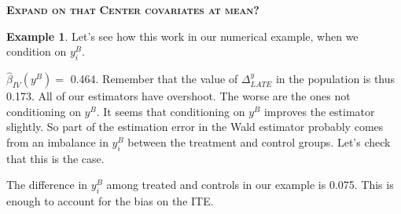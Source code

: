 \documentclass[
]{book}
\newenvironment{Shaded}{\begin{snugshade}}{\end{snugshade}}
\newcommand{\DecValTok}[1]{\textcolor[rgb]{0.00,0.00,0.81}{#1}}
\newcommand{\FloatTok}[1]{\textcolor[rgb]{0.00,0.00,0.81}{#1}}
\newcommand{\FunctionTok}[1]{\textcolor[rgb]{0.00,0.00,0.00}{#1}}
\newcommand{\NormalTok}[1]{#1}
\newcommand{\OtherTok}[1]{\textcolor[rgb]{0.56,0.35,0.01}{#1}}
\newcommand{\SpecialCharTok}[1]{\textcolor[rgb]{0.00,0.00,0.00}{#1}}
\theoremstyle{definition}
\theoremstyle{definition}
\newtheorem{example}{Example}[chapter]
\theoremstyle{definition}
\theoremstyle{definition}
\theoremstyle{remark}
\begin{document}
\textbf{\textsc{Expand on that}}
\textbf{\textsc{Center covariates at mean?}}

\begin{example}
\protect\hypertarget{exm:unnamed-chunk-125}{}{\label{exm:unnamed-chunk-125} }Let's see how this work in our numerical example, when we condition on \(y^B_i\).
\end{example}

\begin{Shaded}
\end{Shaded}

\(\hat{\beta}_{IV}(y^B)=\) 0.464.
Remember that the value of \(\Delta^y_{LATE}\) in the population is thus 0.173.
All of our estimators have overshoot.
The worse are the ones not conditioning on \(y^B\).
It seems that conditioning on \(y^B\) improves the estimator slightly.
So part of the estimation error in the Wald estimator probably comes from an imbalance in \(y_i^B\) between the treatment and control groups.
Let's check that this is the case.

\begin{Shaded}
\end{Shaded}

The difference in \(y_i^B\) among treated and controls in our example is 0.075.
This is enough to account for the bias on the ITE.
\end{document}
